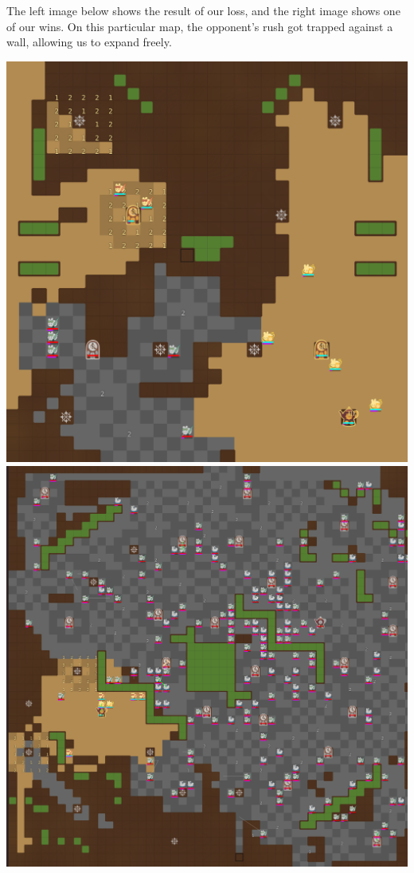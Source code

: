 The left image below shows the result of our loss, and the right image shows one of our wins. On this particular map, the opponent's rush got trapped against a wall, allowing us to expand freely.
\begin{center}
  \includegraphics[scale=0.1]{images/sprint1_loss.png}
  \includegraphics[scale=0.1]{images/sprint1_win.png}
\end{center}
